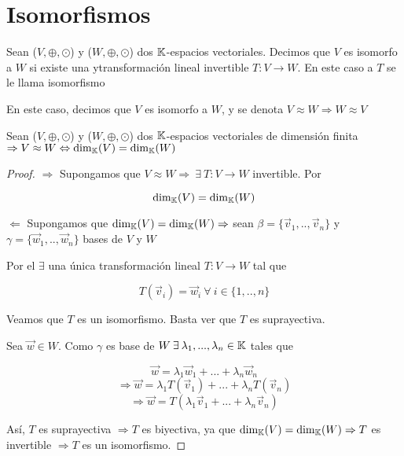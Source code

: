 \section{Isomorfismos}

\begin{definition} [Isomorfismo]
    Sean ($V, \oplus, \odot$) y ($W, \oplus, \odot$)  dos $\mathbb{K}$-espacios vectoriales. Decimos que $V$ es isomorfo a $W$ si existe una ytransformación lineal invertible $T : V \to W$. En este caso a $T$ se le llama isomorfismo 
\end{definition}

\begin{notation}
    En este caso, decimos que $V$ es isomorfo a $W$, y se denota $V \approx W \Rightarrow W \approx V$
\end{notation}

\begin{theorem} \label{theomonline3}
     Sean ($V, \oplus, \odot$) y ($W, \oplus, \odot$)  dos $\mathbb{K}$-espacios vectoriales de dimensión finita $\Rightarrow V \approx W \Leftrightarrow {\dim}_{\mathbb{K}}(V) = {\dim}_{\mathbb{K}}(W)$
\end{theorem}

\begin{proof}
    $\Rightarrow$ Supongamos que $V \approx W \Rightarrow \: \exists \: T : V \to W$ invertible. Por  

    $${\dim}_{\mathbb{K}}(V) = {\dim}_{\mathbb{K}}(W)$$

    $\Leftarrow$ Supongamos que ${\dim}_{\mathbb{K}}(V) = {\dim}_{\mathbb{K}}(W) \Rightarrow$ sean $\beta = \{ \vec{v}_{1}, .., \vec{v}_{n} \}$ y $\gamma = \{ \vec{w}_{1}, .., \vec{w}_{n} \}$ bases de $V$ y $W$

    Por el  $\exists$ una única transformación lineal $T : V \to W$ tal que

    $$T(\vec{v}_{i}) = \vec{w}_{i} \: \forall \: i \in \{ 1, .., n \}$$

    Veamos que $T$ es un isomorfismo. Basta ver que $T$ es suprayectiva. 

    Sea $\vec{w} \in W$. Como $\gamma$ es base de $W \: \exists \: \lambda_1, ..., \lambda_n \in \mathbb{K}$ tales que 

    $$\vec{w} = {\lambda}_{1}{\vec{w}}_{1} +... + {\lambda}_{n}{\vec{w}}_{n}$$
    $$\Rightarrow \vec{w} = {\lambda}_{1} T({\vec{v}}_{1}) + ... + {\lambda}_{n} T({\vec{v}}_{n})$$
    $$\Rightarrow \vec{w} = T({\lambda}_{1}{\vec{v}}_{1} +... + {\lambda}_{n}{\vec{v}}_{n})$$

    Así, $T$ es suprayectiva $\Rightarrow T$ es biyectiva, ya que ${\dim}_{\mathbb{K}}(V) = {\dim}_{\mathbb{K}}(W) \Rightarrow T$ es invertible $\Rightarrow T$ es un isomorfismo.
\end{proof}

